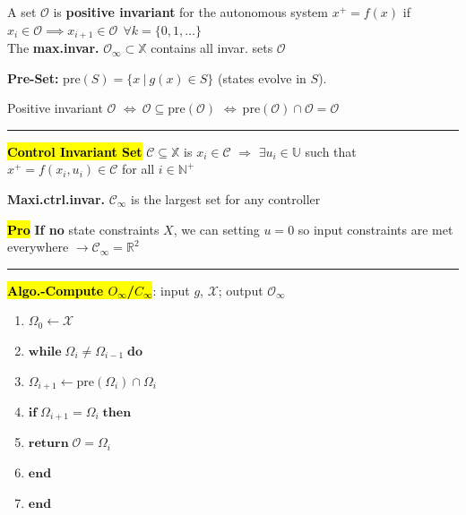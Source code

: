 \documentclass[10pt,a4paper,landscape]{article}
\newcommand{\hlc}[2][yellow]{ {\sethlcolor{#1} \hl{#2}} }
\newcommand{\quadRule}{\vspace{-3pt}\rule{0.23\textwidth}{0.4pt}}
\newcommand{\prove}{\footnotesize{\hlc[pink]{\textbf{Pro}}}} %
\begin{document}
\begin{multicols*}{4}
A set $\mathcal{O}$ is \textbf{positive invariant} for the autonomous system $x^+=f(x)$ if $x_i \in \mathcal{O} \implies x_{i+1} \in \mathcal{O} \:\: \forall k = \{0,1,\ldots \}$\\
The \textbf{max.invar.} $\mathcal{O}_{\infty} \subset \mathbb{X}$ contains all invar. sets $\mathcal{O}$

\textbf{Pre-Set:} $\mathrm{pre}(S)= \{ x \:|\: g(x) \in S \}$ (states evolve in $S$).

Positive invariant $\mathcal{O}$ $\iff \: \mathcal{O} \subseteq \mathrm{pre}(\mathcal{O})$ $\iff \: \mathrm{pre}(\mathcal{O}) \cap \mathcal{O} = \mathcal{O} $

\quadRule

\hl{\textbf{Control Invariant Set}} $\mathcal{C} \subseteq \mathbb{X}$ is $x_{i} \in \mathcal{C}$ $\Rightarrow$ $\exists u_{i} \in \mathbb{U}$ such that $x^+ = f\left(x_{i}, u_{i}\right) \in \mathcal{C} $ for all $ i \in \mathbb{N}^{+}$ 

\textbf{Maxi.ctrl.invar.} $\mathcal{C}_{\infty}$ is the largest set for any controller

\prove \textbf{If no} state constraints $X$, we can setting $u=0$ so input constraints are met everywhere  $\rightarrow \mathcal{C}_{\infty} = \mathbb{R}^2$

\quadRule

\hl{\textbf{Algo.-Compute $O_{\infty}$/$C_{\infty}$}}: input $g$, $\mathcal{X}$; output $\mathcal{O}_\infty$\\
\begin{enumerate}
	\item $\Omega_0 \leftarrow \mathcal{X}$\\
	\item $\mathbf{while}\; \Omega_i\neq\Omega_{i-1}\; \mathbf{do}$\\
	\item \qquad $\Omega_{i+1} \leftarrow \mathrm{pre}(\Omega_{i}) \cap \Omega_{i}$\\
	\item \qquad $\mathbf{if}\; \Omega_{i+1} = \Omega_{i}\; \mathbf{then}$\\
	\item \qquad \qquad $\mathbf{return}\; \mathcal{O} = \Omega_{i}$\\
	\item \qquad $\mathbf{end}$\\
	\item  $\mathbf{end}$
\end{enumerate}


\end{multicols*}
\end{document}
